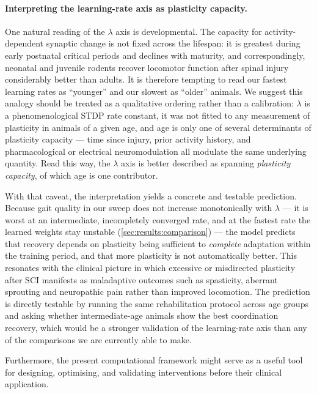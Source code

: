 \paragraph{Interpreting the learning-rate axis as plasticity capacity.}
One natural reading of the $\lambda$ axis is developmental. The capacity
for activity-dependent synaptic change is not fixed across the lifespan:
it is greatest during early postnatal critical periods and declines with
maturity, and correspondingly, neonatal and juvenile rodents recover
locomotor function after spinal injury considerably better than adults.
It is therefore tempting to read our fastest learning rates as
``younger'' and our slowest as ``older'' animals. We suggest this analogy
should be treated as a qualitative ordering rather than a calibration:
$\lambda$ is a phenomenological STDP rate constant, it was not fitted to
any measurement of plasticity in animals of a given age, and age is only
one of several determinants of plasticity capacity --- time since injury,
prior activity history, and pharmacological or electrical neuromodulation
all modulate the same underlying quantity. Read this way, the $\lambda$
axis is better described as spanning \emph{plasticity capacity}, of which
age is one contributor.

With that caveat, the interpretation yields a concrete and testable
prediction. Because gait quality in our sweep does not increase
monotonically with $\lambda$ --- it is worst at an intermediate, incompletely
converged rate, and at the fastest rate the learned weights stay unstable
(\autoref{sec:results:comparison}) --- the model predicts that recovery
depends on plasticity being sufficient to \emph{complete} adaptation within
the training period, and that more plasticity is not automatically better. This resonates with the clinical picture in
which excessive or misdirected plasticity after SCI manifests as
maladaptive outcomes such as spasticity, aberrant sprouting and
neuropathic pain rather than improved locomotion. The prediction is directly testable by running the
same rehabilitation protocol across age groups and asking whether
intermediate-age animals show the best coordination recovery, which would
be a stronger validation of the learning-rate axis than any of the
comparisons we are currently able to make.

Furthermore, the present computational framework might serve as a useful
tool for designing, optimising, and validating interventions before their
clinical application.

